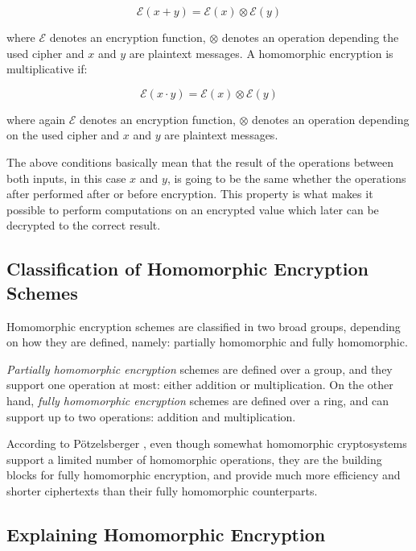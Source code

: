 \begin{equation}
\mathcal{E}(x+y) = \mathcal{E}(x)\otimes \mathcal{E}(y)
\end{equation}

where $\mathcal{E}$ denotes an encryption function, $\otimes$ denotes an operation depending the used cipher and $x$ and $y$ are plaintext messages. A homomorphic encryption is multiplicative if:

\begin{equation}
\mathcal{E}(x \cdot y) = \mathcal{E}(x) \otimes \mathcal{E}(y)
\end{equation}

where again $\mathcal{E}$ denotes an encryption function, $\otimes$ denotes an operation depending on the used cipher and $x$ and $y$ are plaintext messages.

The above conditions basically mean that the result of the operations between both inputs, in this case $x$ and $y$, is going to be the same whether the operations after performed after or before encryption. This property is what makes it possible to perform computations on an encrypted value which later can be decrypted to the correct result.

\subsection{Classification of Homomorphic Encryption Schemes}

Homomorphic encryption schemes are classified in two broad groups, depending on how they are defined, namely: partially homomorphic and fully homomorphic. 

\textit{Partially homomorphic encryption} schemes are defined over a group, and they support one operation at most: either addition or multiplication. On the other hand, \textit{fully homomorphic encryption} schemes are defined over a ring, and can support up to two operations: addition and multiplication.

According to P{\"o}tzelsberger \cite{potzelsberger2013kv}, even though somewhat homomorphic cryptosystems support a limited number of homomorphic operations, they are the building blocks for fully homomorphic encryption, and provide much more efficiency and shorter ciphertexts than their fully homomorphic counterparts. 


\subsection{Explaining Homomorphic Encryption}

